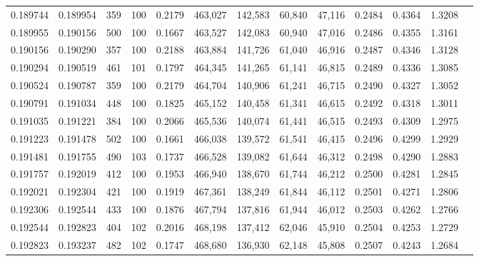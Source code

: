 \begin{tabular}{rrrrrrrrrrrrr}
0.189744 & 0.189954 &   359 & 100 &                                     0.2179 & 463,027 & 142,583 &  60,840 &  47,116 & 0.2484 & 0.4364 & 1.3208 \\
0.189955 & 0.190156 &   500 & 100 &                                     0.1667 & 463,527 & 142,083 &  60,940 &  47,016 & 0.2486 & 0.4355 & 1.3161 \\
0.190156 & 0.190290 &   357 & 100 &                                     0.2188 & 463,884 & 141,726 &  61,040 &  46,916 & 0.2487 & 0.4346 & 1.3128 \\
0.190294 & 0.190519 &   461 & 101 &                                     0.1797 & 464,345 & 141,265 &  61,141 &  46,815 & 0.2489 & 0.4336 & 1.3085 \\
0.190524 & 0.190787 &   359 & 100 &                                     0.2179 & 464,704 & 140,906 &  61,241 &  46,715 & 0.2490 & 0.4327 & 1.3052 \\
0.190791 & 0.191034 &   448 & 100 &                                     0.1825 & 465,152 & 140,458 &  61,341 &  46,615 & 0.2492 & 0.4318 & 1.3011 \\
0.191035 & 0.191221 &   384 & 100 &                                     0.2066 & 465,536 & 140,074 &  61,441 &  46,515 & 0.2493 & 0.4309 & 1.2975 \\
0.191223 & 0.191478 &   502 & 100 &                                     0.1661 & 466,038 & 139,572 &  61,541 &  46,415 & 0.2496 & 0.4299 & 1.2929 \\
0.191481 & 0.191755 &   490 & 103 &                                     0.1737 & 466,528 & 139,082 &  61,644 &  46,312 & 0.2498 & 0.4290 & 1.2883 \\
0.191757 & 0.192019 &   412 & 100 &                                     0.1953 & 466,940 & 138,670 &  61,744 &  46,212 & 0.2500 & 0.4281 & 1.2845 \\
0.192021 & 0.192304 &   421 & 100 &                                     0.1919 & 467,361 & 138,249 &  61,844 &  46,112 & 0.2501 & 0.4271 & 1.2806 \\
0.192306 & 0.192544 &   433 & 100 &                                     0.1876 & 467,794 & 137,816 &  61,944 &  46,012 & 0.2503 & 0.4262 & 1.2766 \\
0.192544 & 0.192823 &   404 & 102 &                                     0.2016 & 468,198 & 137,412 &  62,046 &  45,910 & 0.2504 & 0.4253 & 1.2729 \\
0.192823 & 0.193237 &   482 & 102 &                                     0.1747 & 468,680 & 136,930 &  62,148 &  45,808 & 0.2507 & 0.4243 & 1.2684 \\

\end{tabular}
